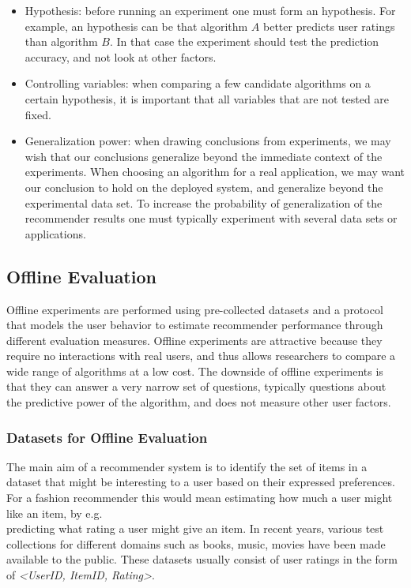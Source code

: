 \begin{itemize}
	\item Hypothesis: before running an experiment one must form an hypothesis. For
		example, an hypothesis can be that algorithm $A$ better predicts user ratings
		than algorithm $B$. In that case the experiment should test the prediction
		accuracy, and not look at other factors.

	\item Controlling variables: when comparing a few candidate algorithms on a
		certain hypothesis, it is important that all variables that are not tested
		are fixed.

	\item Generalization power: when drawing conclusions from experiments, we may
		wish that our conclusions generalize beyond the immediate context of the
		experiments. When choosing an algorithm for a real application, we may want
		our conclusion to hold on the deployed system, and generalize beyond the
		experimental data set. To increase the probability of generalization of the
		recommender results one must typically experiment with several data sets or
		applications.
\end{itemize}

\subsection{Offline Evaluation}
Offline experiments are performed using pre-collected dataset\(s\) and a protocol
that models the user behavior to estimate recommender performance through
different evaluation measures. Offline experiments are attractive because they
require no interactions with real users, and thus allows researchers to compare
a wide range of algorithms at a low cost. The downside of offline experiments
is that they can answer a very narrow set of questions, typically questions
about the predictive power of the algorithm, and does not measure other user
factors.

\subsubsection{Datasets for Offline Evaluation}
The main aim of a recommender system is to identify the set of items in a
dataset that might be interesting to a user based on their expressed
preferences. For a fashion recommender this would mean estimating how much a
user might like an item, by e.g.\\ predicting what rating a user might give an
item. In recent years, various test collections for different domains such as
books, music, movies have been made available to the public. These datasets
usually consist of user ratings in the form of \emph{<UserID, ItemID, Rating>}.

